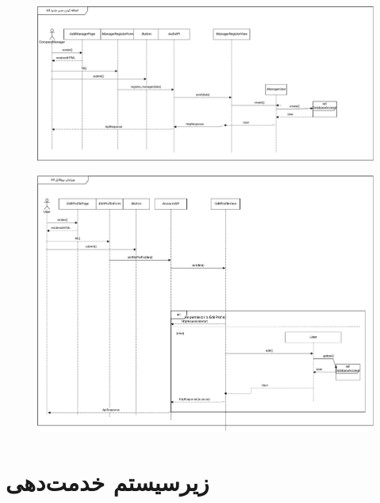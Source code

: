 \eject \pdfpagewidth=13in \pdfpageheight=10in
\begin{figure}[ht!]
	\centering
	\includegraphics[scale=0.8]{figs/design-sequence/3-7.pdf}
\end{figure}
\FloatBarrier
\newpage

\eject \pdfpagewidth=13in \pdfpageheight=10in
\begin{figure}[ht!]
	\centering
	\includegraphics[scale=0.8]{figs/design-sequence/3-8.pdf}
\end{figure}
\FloatBarrier
\newpage

\eject \pdfpagewidth=13in \pdfpageheight=10in

\section{زیرسیستم خدمت‌دهی}

